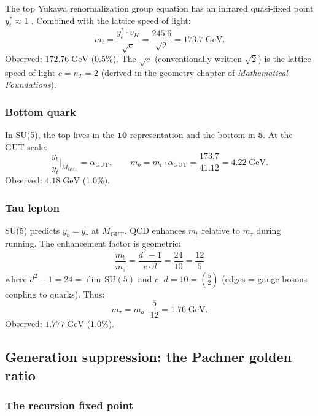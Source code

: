The top Yukawa renormalization group equation has an infrared quasi-fixed point $y^*_t \approx 1$ \cite{Pendleton, Hill}. Combined with the lattice speed of light:
\begin{equation}
m_t = \frac{y^*_t \cdot v_H}{\sqrt{c}} = \frac{245.6}{\sqrt{2}} = 173.7\;\text{GeV}.
\end{equation}
Observed: $172.76\;\text{GeV}$ (0.5\%). The $\sqrt{c}$ (conventionally written $\sqrt{2}$) is the lattice speed of light $c = n_T = 2$ (derived in the geometry chapter of \textit{Mathematical Foundations}).

\subsubsection{Bottom quark}

In SU(5), the top lives in the $\mathbf{10}$ representation and the bottom in $\bar{\mathbf{5}}$. At the GUT scale:
\begin{equation}
\frac{y_b}{y_t}\bigg|_{M_\text{GUT}} = \alpha_\text{GUT}, \qquad m_b = m_t \cdot \alpha_\text{GUT} = \frac{173.7}{41.12} = 4.22\;\text{GeV}.
\end{equation}
Observed: $4.18\;\text{GeV}$ (1.0\%).

\subsubsection{Tau lepton}

SU(5) predicts $y_b = y_\tau$ at $M_\text{GUT}$. QCD enhances $m_b$ relative to $m_\tau$ during running. The enhancement factor is geometric:
\begin{equation}
\frac{m_b}{m_\tau} = \frac{d^2 - 1}{c \cdot d} = \frac{24}{10} = \frac{12}{5}
\end{equation}
where $d^2 - 1 = 24 = \dim\,\text{SU}(5)$ and $c \cdot d = 10 = \binom{5}{2}$ (edges = gauge bosons coupling to quarks). Thus:
\begin{equation}
m_\tau = m_b \cdot \frac{5}{12} = 1.76\;\text{GeV}.
\end{equation}
Observed: $1.777\;\text{GeV}$ (1.0\%).

\subsection{Generation suppression: the Pachner golden ratio}

\subsubsection{The recursion fixed point}

